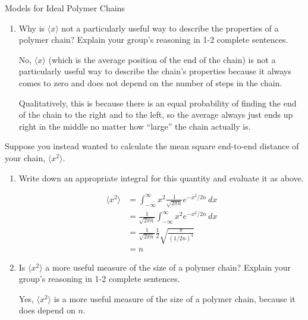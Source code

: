 \begin{activity}{Models for Ideal Polymer Chains}
\begin{ctqs}
\begin{enumerate}
			\item Why is $\langle x \rangle$ not a particularly useful way to describe the properties of a polymer chain?  Explain your group's reasoning in 1-2 complete sentences.
				
				\begin{solution}[1.5in]
					No, $\langle x \rangle$ (which is the average position of the end of the chain) is not a particularly useful way to describe the chain's properties because it always comes to zero and does not depend on the number of steps in the chain.  
					
					Qualitatively, this is because there is an equal probability of finding the end of the chain to the right and to the left, so the average always just ends up right in the middle no matter how ``large'' the chain actually is.
				\end{solution}
			
		\end{enumerate}
		
	\question Suppose you instead wanted to calculate the mean square end-to-end distance of your chain, $\langle x^2\rangle$.
	
		\begin{enumerate}
			\item Write down an appropriate integral for this quantity and evaluate it as above.
				
				\begin{solution}[1.5in]
					\begin{align*}
						\langle x^2 \rangle &= \int_{-\infty}^\infty x^2 \frac{1}{\sqrt{2\pi n}}e^{-x^2/2n}\, dx\\
						&= \frac{1}{\sqrt{2\pi n}} \int_{-\infty}^\infty x^2 e^{-x^2/2n}\, dx\\
						&= \frac{1}{\sqrt{2\pi n}} \frac{1}{2}\sqrt{\frac{\pi}{(1/2n)^3}}\\
						&= n
					\end{align*}
				\end{solution}
			
			\item Is $\langle x^2 \rangle$ a more useful measure of the size of a polymer chain?  Explain your group's reasoning in 1-2 complete sentences.
				
				\begin{solution}[1.5in]
				
					Yes, $\langle x^2 \rangle$ is a more useful measure of the size of a polymer chain, because it does depend on $n$.
					

\end{solution}
\end{enumerate}
\end{ctqs}
\end{activity}
